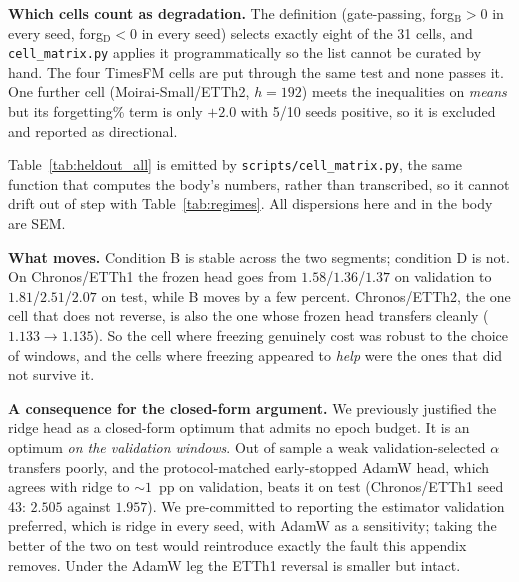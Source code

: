 \documentclass{article}
\begin{document}
\textbf{Which cells count as degradation.} The definition (gate-passing, forg$_\text{B}>0$ in
every seed, forg$_\text{D}<0$ in every seed) selects exactly eight of the 31 cells, and
\texttt{cell\_matrix.py} applies it programmatically so the list cannot be curated by hand. The four
TimesFM cells are put through the same test and none passes it. One
further cell (Moirai-Small/ETTh2, $h{=}192$) meets the inequalities on \emph{means} but its forgetting\%
term is only $+2.0$ with 5/10 seeds positive, so it is excluded and reported as directional.

Table~\ref{tab:heldout_all} is emitted by \texttt{scripts/cell\_matrix.py}, the same function that
computes the body's numbers, rather than transcribed, so it cannot drift out of step with
Table~\ref{tab:regimes}. All dispersions here and in the body are SEM.

\begin{table}[h]
\centering
\caption{Every cell, both scorings. Gate and B$-$D are computed on the same test windows;
\textsuperscript{f} marks the three cells that gate-fail there. ``Reverses'' $=$ the sign of B$-$D
differs between the two scorings.}
\label{tab:heldout_all}

\end{table}

\textbf{What moves.} Condition B is stable across the two segments; condition D is not. On
Chronos/ETTh1 the frozen head goes from $1.58$/$1.36$/$1.37$ on validation to
$1.81$/$2.51$/$2.07$ on test, while B moves by a few percent. Chronos/ETTh2, the one cell that does
not reverse, is also the one whose frozen head transfers cleanly ($1.133 \to 1.135$). So the cell
where freezing genuinely cost was robust to the choice of windows, and the cells where freezing
appeared to \emph{help} were the ones that did not survive it.

\textbf{A consequence for the closed-form argument.} We previously justified the ridge head as a
closed-form optimum that admits no epoch budget. It is an optimum \emph{on the validation windows}.
Out of sample a weak validation-selected $\alpha$ transfers poorly, and the protocol-matched
early-stopped AdamW head, which agrees with ridge to ${\sim}1$~pp on validation, beats it on test
(Chronos/ETTh1 seed 43: $2.505$ against $1.957$). We pre-committed to reporting the estimator
validation preferred, which is ridge in every seed, with AdamW as a sensitivity; taking the better
of the two on test would reintroduce exactly the fault this appendix removes. Under the AdamW leg
the ETTh1 reversal is smaller but intact.
\end{document}

